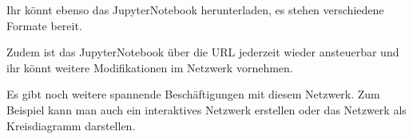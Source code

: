 \documentclass[11pt]{article}
\begin{document}
Ihr könnt ebenso das JupyterNotebook herunterladen, es stehen
verschiedene Formate bereit.

Zudem ist das JupyterNotebook über die URL jederzeit wieder ansteuerbar
und ihr könnt weitere Modifikationen im Netzwerk vornehmen.

Es gibt noch weitere spannende Beschäftigungen mit diesem Netzwerk. Zum
Beispiel kann man auch ein interaktives Netzwerk erstellen oder das
Netzwerk als Kreisdiagramm darstellen.


    
    
    
\end{document}
